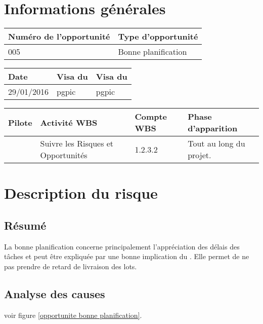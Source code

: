 \section*{Informations générales}
 
\begin{table}[h]
\centering
	\begin{tabularx}{16.8cm}{|X|X|}
	\hline
	\rowcolor{gray!40} Numéro de l'opportunité & Type d'opportunité \\
	\hline
	005 & Bonne planification \\
	\hline
	\end{tabularx}
\end{table}

\begin{table}[h]
\centering
	\begin{tabularx}{16.8cm}{|X|X|X|}
	\hline
	\rowcolor{gray!40} Date & Visa du \RQ & Visa du \CP \\
	\hline
	 29/01/2016 & pgpic & pgpic \\
	\hline
	\end{tabularx}
\end{table}

\begin{table}[h]
\centering
	\begin{tabularx}{16.8cm}{|X|X|X|X|}
	\hline
	\rowcolor{gray!40} Pilote & Activité WBS & Compte WBS & Phase d'apparition \\
	\hline
	 \Florian & Suivre les Risques et Opportunités & 1.2.3.2 & Tout au long du projet.\\
	\hline
	\end{tabularx}
\end{table}

\section*{Description du risque}

\subsection*{Résumé}

	La bonne planification concerne principalement l’appréciation des délais des tâches
et peut être expliquée par une bonne implication du \CP. Elle permet de ne pas prendre de retard de
livraison des lots.
	
\subsection*{Analyse des causes}
	voir figure \ref{opportunite bonne planification}.

